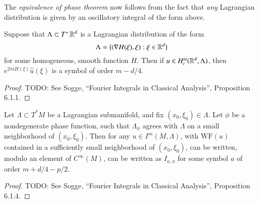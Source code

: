 The \emph{equivalence of phase theorem} now follows from the fact that \emph{any} Lagrangian distribution is given by an oscillatory integral of the form above.

\begin{lemma}
    Suppose that $\Lambda \subset T^* \operatorname{\mathbb{R}}^d$ is a Lagrangian distribution of the form
    \[ \Lambda = \{ (\nabla H(\xi), \xi) : \xi \in \operatorname{\mathbb{R}}^d \} \]
    for some homogeneous, smooth function $H$. Then if $u \in H^m_c(\operatorname{\mathbb{R}}^d, \Lambda)$, then $e^{2 \pi i H(\xi)} \widehat{u}(\xi)$ is a symbol of order $m - d/4$.
\end{lemma}
\begin{proof}
    TODO: See Sogge, ``Fourier Integrals in Classical Analysis'', Proposition 6.1.1.
\end{proof}

\begin{theorem}
    Let $\Lambda \subset T^*M$ be a Lagrangian submanifold, and fix $(x_0,\xi_0) \in \Lambda$. Let $\phi$ be a nondegenerate phase function, such that $\Lambda_\phi$ agrees with $\Lambda$ on a small neighborhood of $(x_0,\xi_0)$. Then for any $u \in I^m(M, \Lambda)$, with $\text{WF}(u)$ contained in a sufficiently small neighborhood of $(x_0,\xi_0)$, can be written, modulo an element of $C^\infty(M)$, can be written as $I_{a,\phi}$ for some symbol $a$ of order $m + d/4 - p/2$.
\end{theorem}
\begin{proof}
    TODO: See Sogge, ``Fourier Integrals in Classical Analysis'', Proposition 6.1.4.
\end{proof}

